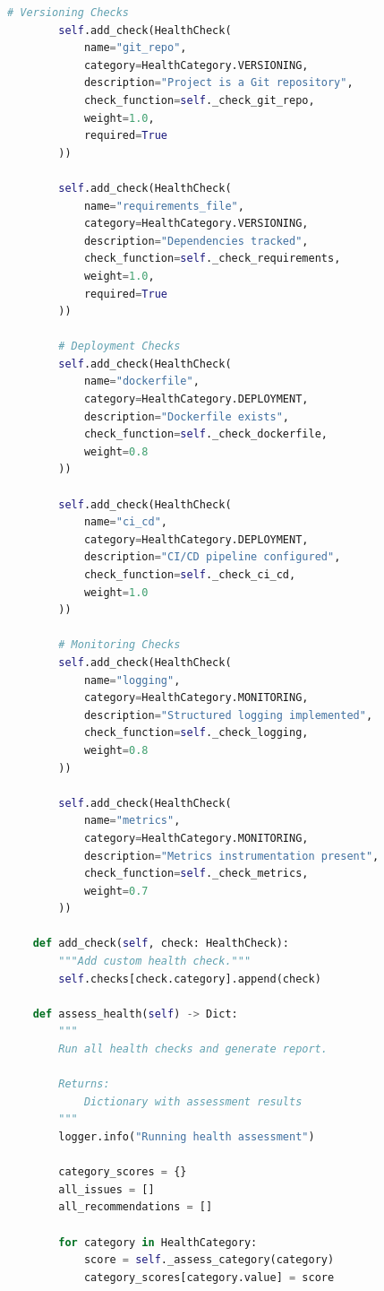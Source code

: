 \begin{lstlisting}[language=Python, caption={ML Project Health Assessment}]
        # Versioning Checks
        self.add_check(HealthCheck(
            name="git_repo",
            category=HealthCategory.VERSIONING,
            description="Project is a Git repository",
            check_function=self._check_git_repo,
            weight=1.0,
            required=True
        ))

        self.add_check(HealthCheck(
            name="requirements_file",
            category=HealthCategory.VERSIONING,
            description="Dependencies tracked",
            check_function=self._check_requirements,
            weight=1.0,
            required=True
        ))

        # Deployment Checks
        self.add_check(HealthCheck(
            name="dockerfile",
            category=HealthCategory.DEPLOYMENT,
            description="Dockerfile exists",
            check_function=self._check_dockerfile,
            weight=0.8
        ))

        self.add_check(HealthCheck(
            name="ci_cd",
            category=HealthCategory.DEPLOYMENT,
            description="CI/CD pipeline configured",
            check_function=self._check_ci_cd,
            weight=1.0
        ))

        # Monitoring Checks
        self.add_check(HealthCheck(
            name="logging",
            category=HealthCategory.MONITORING,
            description="Structured logging implemented",
            check_function=self._check_logging,
            weight=0.8
        ))

        self.add_check(HealthCheck(
            name="metrics",
            category=HealthCategory.MONITORING,
            description="Metrics instrumentation present",
            check_function=self._check_metrics,
            weight=0.7
        ))

    def add_check(self, check: HealthCheck):
        """Add custom health check."""
        self.checks[check.category].append(check)

    def assess_health(self) -> Dict:
        """
        Run all health checks and generate report.

        Returns:
            Dictionary with assessment results
        """
        logger.info("Running health assessment")

        category_scores = {}
        all_issues = []
        all_recommendations = []

        for category in HealthCategory:
            score = self._assess_category(category)
            category_scores[category.value] = score


\end{lstlisting}
